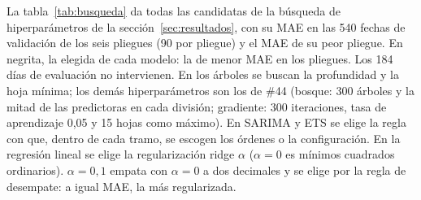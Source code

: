 La tabla~\ref{tab:busqueda} da todas las candidatas de la búsqueda de hiperparámetros de la sección~\ref{sec:resultados}, con su MAE en las 540 fechas de validación de los seis pliegues (90 por pliegue) y el MAE de su peor pliegue. En negrita, la elegida de cada modelo: la de menor MAE en los pliegues. Los 184 días de evaluación no intervienen. En los árboles se buscan la profundidad y la hoja mínima; los demás hiperparámetros son los de \#44 (bosque: 300 árboles y la mitad de las predictoras en cada división; gradiente: 300 iteraciones, tasa de aprendizaje 0,05 y 15 hojas como máximo). En SARIMA y ETS se elige la regla con que, dentro de cada tramo, se escogen los órdenes o la configuración. En la regresión lineal se elige la regularización ridge $\alpha$ ($\alpha = 0$ es mínimos cuadrados ordinarios). $\alpha = 0{,}1$ empata con $\alpha = 0$ a dos decimales y se elige por la regla de desempate: a igual MAE, la más regularizada.

